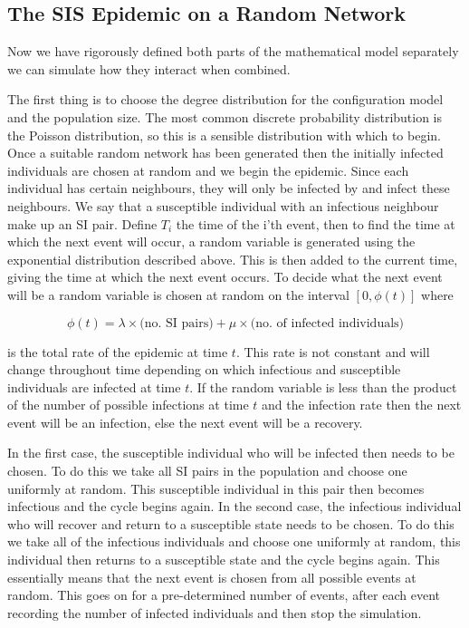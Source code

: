 \documentclass{uonmathsreport}
\begin{document}
\subsection{The SIS Epidemic on a Random Network} \label{subsub:5.3}

Now we have rigorously defined both parts of the mathematical model separately we can simulate how they interact when combined.

The first thing is to choose the degree distribution for the configuration model and the population size. The most common discrete probability distribution is the Poisson distribution, so this is a sensible distribution with which to begin. Once a suitable random network has been generated then the initially infected individuals are chosen at random and we begin the epidemic. Since each individual has certain neighbours, they will only be infected by and infect these neighbours. We say that a susceptible individual with an infectious neighbour make up an SI pair. Define $T_i$ the time of the i'th event, then to find the time at which the next event will occur, a random variable is generated using the exponential distribution described above. This is then added to the current time, giving the time at which the next event occurs. To decide what the next event will be a random variable is chosen at random on the interval $[0,\phi(t)]$ where 

\begin{equation} \label{totalrate}
\phi(t) = \lambda \times\mbox{(no. SI pairs)} + \mu \times\mbox{(no. of infected individuals)}
\end{equation}

is the total rate of the epidemic at time $t$. This rate is not constant and will change throughout time depending on which infectious and susceptible individuals are infected at time $t$.  If the random variable is less than the product of the number of possible infections at time $t$ and the infection rate then the next event will be an infection, else the next event will be a recovery. 

In the first case, the susceptible individual who will be infected then needs to be chosen. To do this we take all SI pairs in the population and choose one uniformly at random. This susceptible individual in this pair then becomes infectious and the cycle begins again. In the second case, the infectious individual who will recover and return to a susceptible state needs to be chosen. To do this we take all of the infectious individuals and choose one uniformly at random, this individual then returns to a susceptible state and the cycle begins again. This essentially means that the next event is chosen from all possible events at random. This goes on for a pre-determined number of events, after each event recording the number of infected individuals and then stop the simulation.
\end{document}
